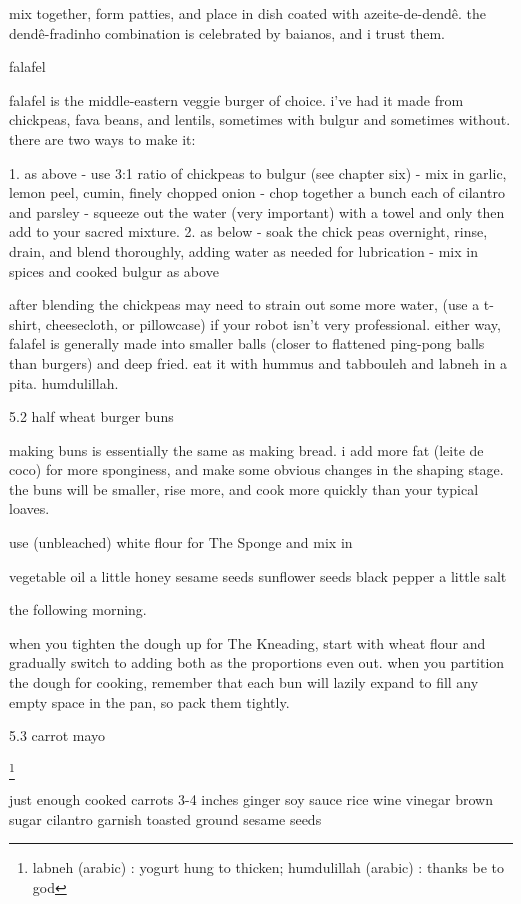 mix together, form patties, and place in dish coated with azeite-de-dend\^{e}. the dend\^{e}-fradinho combination is celebrated by baianos, and i trust them.

falafel

falafel is the middle-eastern veggie burger of choice. i've had it made from chickpeas, fava beans, and lentils, sometimes with bulgur and sometimes without. there are two ways to make it:

1. as above
-	use 3:1 ratio of chickpeas to bulgur (see chapter six)
-	mix in garlic, lemon peel, cumin, finely chopped onion
-	chop together a bunch each of cilantro and parsley
- squeeze out the water (very important) with a towel and only then add to your sacred mixture.
2. as below
-	soak the chick peas overnight, rinse, drain, and blend thoroughly, adding water as needed for lubrication
-	mix in spices and cooked bulgur as above

after blending the chickpeas may need to strain out some more water, (use a t-shirt, cheesecloth, or pillowcase) if your robot isn't very professional. either way, falafel is generally made into smaller balls (closer to flattened ping-pong balls than burgers) and deep fried. eat it with hummus and tabbouleh and labneh in a pita. humdulillah.

5.2  half wheat burger buns

making buns is essentially the same as making bread. i add more fat (leite de coco) for more sponginess, and make some obvious changes in the shaping stage. the buns will be smaller, rise more, and cook more quickly than your typical loaves.

use (unbleached) white flour for The Sponge and mix in

	vegetable oil
	a little honey
	sesame seeds
	sunflower seeds
	black pepper
	a little salt

the following morning.

when you tighten the dough up for The Kneading, start with wheat flour and gradually switch to adding both as the proportions even out.
when you partition the dough for cooking, remember that each bun will lazily expand to fill any empty space in the pan, so pack them tightly.

5.3  carrot mayo

\footnote{labneh (arabic) : yogurt hung to thicken;   humdulillah (arabic) : thanks be to god}

just enough cooked carrots
3-4 inches ginger
soy sauce
rice wine vinegar
brown sugar
cilantro garnish
toasted ground sesame seeds

